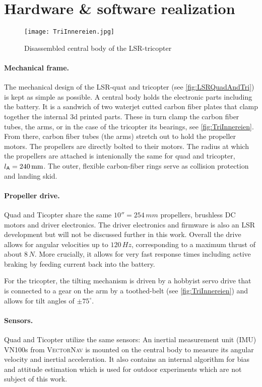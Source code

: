 \section{Hardware \& software realization}

\begin{figure}
 \centering
 \texttt{[image: TriInnereien.jpg]}
 \caption{Disassembled central body of the LSR-tricopter}
 \label{fig:TriInnereien}
\end{figure}

\paragraph{Mechanical frame.}
The mechanical design of the LSR-quat and tricopter (see \autoref{fig:LSRQuadAndTri}) is kept as simple as possible.
A central body holds the electronic parts including the battery.
It is a sandwich of two waterjet cutted carbon fiber plates that clamp together the internal 3d printed parts. 
These in turn clamp the carbon fiber tubes, the arms, or in the case of the tricopter its bearings, see \autoref{fig:TriInnereien}.
From there, carbon fiber tubes (the arms) stretch out to hold the propeller motors.
The propellers are directly bolted to their motors.
The radius at which the propellers are attached is intenionally the same for quad and tricopter, $l_{\mathsf{A}} = 240\,\text{mm}$.
The outer, flexible carbon-fiber rings serve as collision protection and landing skid.

\paragraph{Propeller drive.}
Quad and Ticopter share the same $10'' = 254\,\unit{mm}$ propellers, brushless DC motors and driver electronics.
The driver electronics and firmware is also an LSR development but will not be discussed further in this work.
Overall the drive allows for angular velocities up to $120\,\unit{Hz}$, corresponding to a maximum thrust of about $8\,\unit{N}$.
More crucially, it allows for very fast response times including active braking by feeding current back into the battery.

For the tricopter, the tilting mechanism is driven by a hobbyist servo drive that is connected to a gear on the arm by a toothed-belt (see \autoref{fig:TriInnereien}) and allows for tilt angles of $\pm 75^\circ$.

\paragraph{Sensors.}
Quad and Ticopter utilize the same sensors:
An inertial measurement unit (IMU) VN100s from \textsc{VectorNav} is mounted on the central body to measure its angular velocity and inertial acceleration.
It also contains an internal algorithm for bias and attitude estimation which is used for outdoor experiments which are not subject of this work.

